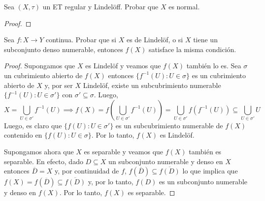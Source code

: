 \documentclass{article}
\theoremstyle{definition}
\newcommand{\cl}[1]{\overline{#1}}              %
\newenvironment{ejercicio}[1]{\begin{trivlist}
\item[\hskip \labelsep {\bfseries Ejercicio}\hskip \labelsep {\bfseries #1.}]}{\end{trivlist}}
\begin{document}
\begin{ejercicio}{C2}
    Sea \((X, \tau)\) un ET regular y Lindelöff. Probar que \(X\) es normal.
\end{ejercicio}
\begin{proof}

\end{proof}

\begin{ejercicio}{C3}
    Sea \(f : X \rightarrow Y\) continua. Probar que si \(X\) es de Lindelöf, o si \(X\) tiene un subconjunto denso numerable, entonces \(f(X)\) satisface la misma condición.
\end{ejercicio}
\begin{proof}
    Supongamos que \( X \) es Lindelöf y veamos que \( f(X) \) también lo es. Sea \( \sigma \) un cubrimiento abierto de \( f(X) \) entonces \( \{ f^{-1}(U) : U \in \sigma \} \) es un cubrimiento abierto de \( X \) y, por ser \( X \) Lindelöf, existe un subcubrimiento numerable \( \{ f^{-1}(U) : U \in \sigma' \} \) con \( \sigma' \subseteq \sigma \).
    Luego, \[
        X = \bigcup_{U \in \sigma'} f^{-1}(U) \implies f(X) = f\left( \bigcup_{U \in \sigma'} f^{-1}(U) \right) = \bigcup_{U \in \sigma'} f(f^{-1}(U)) \subseteq \bigcup_{U \in \sigma'} U
    \]
    Luego, es claro que \( \{ f(U) : U \in \sigma' \} \) es un subcubrimiento numerable de \( f(X) \) contenido en \( \{ f(U) : U \in \sigma \} \). Por lo tanto, \( f(X) \) es Lindelöf.

    Supongamos ahora que \( X \) es separable y veamos que \( f(X) \) también es separable.
    En efecto, dado \( D \subseteq X \) un subconjunto numerable y denso en \( X \) entonces \( \cl{D} = X \) y, por continuidad de \( f \), \( f(\cl{D}) \subseteq \cl{f(D)} \) lo que implica que \( f(X) = f(\cl{D}) \subseteq \cl{f(D)} \) y, por lo tanto, \( f(D) \) es un subconjunto numerable y denso en \( f(X) \). Por lo tanto, \( f(X) \) es separable.
\end{proof}
\end{document}
